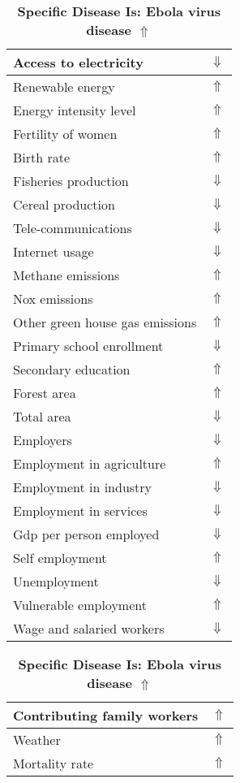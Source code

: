 \documentclass[12pt,notitlepage,oneside]{report}
\begin{document}
\begin{table}[!htb]
\caption{\textbf{Specific Disease Is: Ebola virus disease $\Uparrow$}}
\centering
\label{Correlated Socio-economic Factors0}
\begin{tabular}{|l|l|}
\hline
Access to electricity & $\Downarrow$\\ \hline
Renewable energy & $\Uparrow$\\ \hline
Energy intensity level & $\Uparrow$\\ \hline
Fertility of women & $\Uparrow$\\ \hline
Birth rate & $\Uparrow$\\ \hline
Fisheries production & $\Downarrow$\\ \hline
Cereal production & $\Downarrow$\\ \hline
Tele-communications & $\Downarrow$\\ \hline
Internet usage & $\Downarrow$\\ \hline
Methane emissions & $\Uparrow$\\ \hline
Nox emissions & $\Uparrow$\\ \hline
Other green house gas emissions & $\Uparrow$\\ \hline
Primary school enrollment & $\Downarrow$\\ \hline
Secondary education & $\Uparrow$\\ \hline
Forest area & $\Uparrow$\\ \hline
Total area & $\Downarrow$\\ \hline
Employers & $\Downarrow$\\ \hline
Employment in agriculture & $\Uparrow$\\ \hline
Employment in industry & $\Downarrow$\\ \hline
Employment in services & $\Downarrow$\\ \hline
Gdp per person employed & $\Downarrow$\\ \hline
Self employment & $\Uparrow$\\ \hline
Unemployment & $\Downarrow$\\ \hline
Vulnerable employment & $\Uparrow$\\ \hline
Wage and salaried workers & $\Downarrow$\\ \hline
\end{tabular}
\begin{tabular}{|l|l|}
\hline
Contributing family workers & $\Uparrow$\\ \hline
Weather & $\Uparrow$\\ \hline
Mortality rate & $\Uparrow$\\ \hline

\end{tabular}
\end{table}
\end{document}
